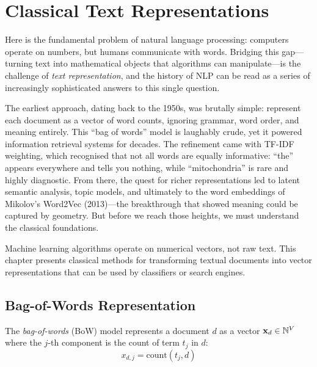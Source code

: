 \chapter{Classical Text Representations}
\label{ch:representations}

Here is the fundamental problem of natural language processing: computers operate on numbers, but humans communicate with words. Bridging this gap---turning text into mathematical objects that algorithms can manipulate---is the challenge of \emph{text representation}, and the history of NLP can be read as a series of increasingly sophisticated answers to this single question.

The earliest approach, dating back to the 1950s, was brutally simple: represent each document as a vector of word counts, ignoring grammar, word order, and meaning entirely. This ``bag of words'' model is laughably crude, yet it powered information retrieval systems for decades. The refinement came with TF-IDF weighting, which recognised that not all words are equally informative: ``the'' appears everywhere and tells you nothing, while ``mitochondria'' is rare and highly diagnostic. From there, the quest for richer representations led to latent semantic analysis, topic models, and ultimately to the word embeddings of Mikolov's Word2Vec (2013)---the breakthrough that showed meaning could be captured by geometry. But before we reach those heights, we must understand the classical foundations.

\begin{intuition}[title=\textbf{From text to vectors}]
Machine learning algorithms operate on numerical vectors, not raw text. This
chapter presents classical methods for transforming textual documents into
vector representations that can be used by classifiers or search engines.
\end{intuition}

\section{Bag-of-Words Representation}
\label{sec:rep:bow}

\begin{definition}
The \emph{bag-of-words} (BoW) model represents a document $d$ as a vector
$\mathbf{x}_d \in \mathbb{N}^V$ where the $j$-th component is the count of term $t_j$
in $d$:
\[
x_{d,j} = \text{count}(t_j, d)
\]
\end{definition}

